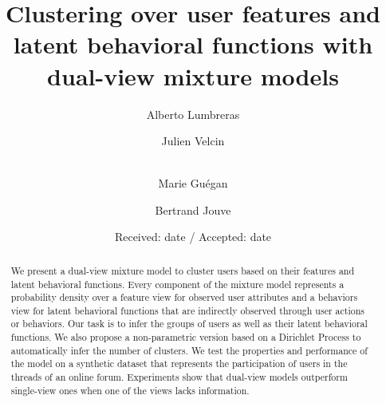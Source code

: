 \documentclass[smallextended]{svjour3}          %
\begin{document}
\title{Clustering over user features and latent behavioral functions with dual-view mixture models}

\author{Alberto Lumbreras \and
        Julien Velcin  \and\\
        Marie Guégan \and
        Bertrand Jouve
}



\date{Received: date / Accepted: date}

\maketitle
\begin{abstract}
We present a dual-view mixture model to cluster users based on their features and latent behavioral functions. Every component of the mixture model represents a probability density over a feature view for observed user attributes and a behaviors view for latent behavioral functions that are indirectly observed through user actions or behaviors. Our task is to infer the groups of users as well as their latent behavioral functions. We also propose a non-parametric version based on a Dirichlet Process to automatically infer the number of clusters. We test the properties and performance of the model on a synthetic dataset that represents the participation of users in the threads of an online forum. Experiments show that dual-view models outperform single-view ones when one of the views lacks information.
\end{abstract}
\end{document}
